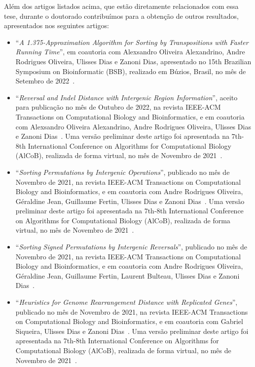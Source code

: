Além dos artigos listados acima, que estão diretamente relacionados com essa tese, durante o doutorado contribuímos para a obtenção de  outros resultados, apresentados nos seguintes artigos:

\begin{itemize}
  \item ``\textit{A 1.375-Approximation Algorithm for Sorting by Transpositions with Faster Running Time}'', em coautoria com Alexsandro Oliveira Alexandrino, Andre Rodrigues Oliveira, Ulisses Dias e Zanoni Dias, apresentado no 15th Brazilian Symposium on Bioinformatic (BSB), realizado em Búzios, Brasil, no mês de Setembro de 2022~\cite{2022bsb-alexandrino-etal}.

  \item ``\textit{Reversal and Indel Distance with Intergenic Region Information}'', aceito para publicação no mês de Outubro de 2022, na revista IEEE-ACM Transactions on Computational Biology and Bioinformatics, e em coautoria com Alexsandro Oliveira Alexandrino, Andre Rodrigues Oliveira, Ulisses Dias e Zanoni Dias~\cite{2022b-alexandrino-etal}. Uma versão preliminar deste artigo foi apresentada na 7th-8th International Conference on Algorithms for Computational Biology (AlCoB), realizada de forma virtual, no mês de Novembro de 2021~\cite{2021b-alexandrino-etal}.

  \item ``\textit{Sorting Permutations by Intergenic Operations}'', publicado no mês de Novembro de 2021, na revista IEEE-ACM Transactions on Computational Biology and Bioinformatics, e em coautoria com Andre Rodrigues Oliveira, Géraldine Jean, Guillaume Fertin, Ulisses Dias e Zanoni Dias~\cite{2021a-oliveira-etal}. Uma versão preliminar deste artigo foi apresentada na 7th-8th International Conference on Algorithms for Computational Biology (AlCoB), realizada de forma virtual, no mês de Novembro de 2021~\cite{2020-oliveira-etal}.

  \item ``\textit{Sorting Signed Permutations by Intergenic Reversals}'', publicado no mês de Novembro de 2021, na revista IEEE-ACM Transactions on Computational Biology and Bioinformatics, e em coautoria com Andre Rodrigues Oliveira, Géraldine Jean, Guillaume Fertin, Laurent Bulteau, Ulisses Dias e Zanoni Dias~\cite{2021b-oliveira-etal}.

  \item ``\textit{Heuristics for Genome Rearrangement Distance with Replicated Genes}'', publicado no mês de Novembro de 2021, na revista IEEE-ACM Transactions on Computational Biology and Bioinformatics, e em coautoria com Gabriel Siqueira, Ulisses Dias e Zanoni Dias~\cite{2021a-siqueira-etal}. Uma versão preliminar deste artigo foi apresentada na 7th-8th International Conference on Algorithms for Computational Biology (AlCoB), realizada de forma virtual, no mês de Novembro de 2021~\cite{2020-siqueira-etal}.


\end{itemize}
